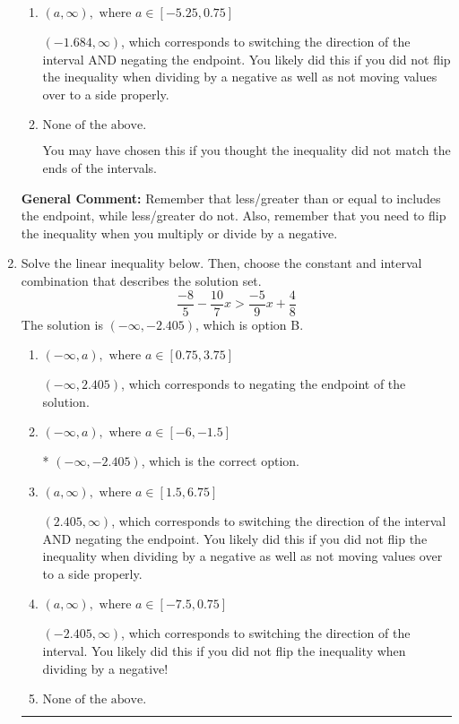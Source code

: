 \documentclass{extbook}[14pt]
\newcommand{\litem}[1]{\item #1

\rule{\textwidth}{0.4pt}}
\begin{document}
\begin{enumerate}
{\begin{enumerate}[label=\Alph*.]
 $(1.684, \infty)$, which corresponds to switching the direction of the interval. You likely did this if you did not flip the inequality when dividing by a negative!
\item \( (a, \infty), \text{ where } a \in [-5.25, 0.75] \)

 $(-1.684, \infty)$, which corresponds to switching the direction of the interval AND negating the endpoint. You likely did this if you did not flip the inequality when dividing by a negative as well as not moving values over to a side properly.
\item \( \text{None of the above}. \)

You may have chosen this if you thought the inequality did not match the ends of the intervals.
\end{enumerate}

\textbf{General Comment:} Remember that less/greater than or equal to includes the endpoint, while less/greater do not. Also, remember that you need to flip the inequality when you multiply or divide by a negative.
}
\litem{
Solve the linear inequality below. Then, choose the constant and interval combination that describes the solution set.
\[ \frac{-8}{5} - \frac{10}{7} x > \frac{-5}{9} x + \frac{4}{8} \]The solution is \( (-\infty, -2.405) \), which is option B.\begin{enumerate}[label=\Alph*.]
\item \( (-\infty, a), \text{ where } a \in [0.75, 3.75] \)

 $(-\infty, 2.405)$, which corresponds to negating the endpoint of the solution.
\item \( (-\infty, a), \text{ where } a \in [-6, -1.5] \)

* $(-\infty, -2.405)$, which is the correct option.
\item \( (a, \infty), \text{ where } a \in [1.5, 6.75] \)

 $(2.405, \infty)$, which corresponds to switching the direction of the interval AND negating the endpoint. You likely did this if you did not flip the inequality when dividing by a negative as well as not moving values over to a side properly.
\item \( (a, \infty), \text{ where } a \in [-7.5, 0.75] \)

 $(-2.405, \infty)$, which corresponds to switching the direction of the interval. You likely did this if you did not flip the inequality when dividing by a negative!
\item \( \text{None of the above}. \)


\end{enumerate}}
\end{enumerate}
\end{document}
